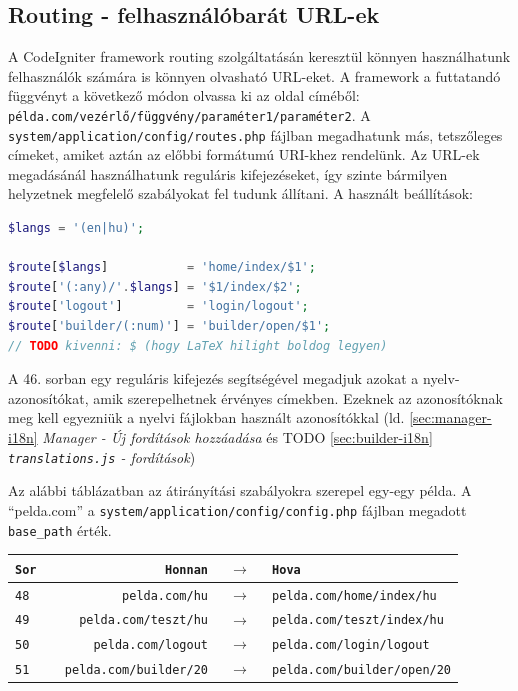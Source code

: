 \documentclass[12pt,a4paper,twoside]{article}
\begin{document}
\subsection{Routing - felhasználóbarát URL-ek}

A CodeIgniter framework routing\cite{CI-Routing} szolgáltatásán keresztül
könnyen használhatunk felhasználók számára is könnyen olvasható URL-eket.
A framework a futtatandó függvényt a következő módon olvassa ki az oldal
címéből: \texttt{példa.com/vezérlő/függvény/paraméter1/paraméter2}.
A \texttt{system/application/config/routes.php} fájlban megadhatunk más,
tetszőleges címeket, amiket aztán az előbbi formátumú URI-khez rendelünk. Az
URL-ek megadásánál használhatunk reguláris kifejezéseket\cite{regex}, így szinte
bármilyen helyzetnek megfelelő szabályokat fel tudunk állítani. A használt
beállítások:

\begin{lstlisting}[language=PHP, firstnumber=46]
$langs = '(en|hu)';

$route[$langs]           = 'home/index/$1';
$route['(:any)/'.$langs] = '$1/index/$2';
$route['logout']         = 'login/logout';
$route['builder/(:num)'] = 'builder/open/$1';
// TODO kivenni: $ (hogy LaTeX hilight boldog legyen)
\end{lstlisting}

A 46. sorban egy reguláris kifejezés segítségével megadjuk azokat a
nyelv-azonosítókat, amik szerepelhetnek érvényes címekben. Ezeknek az
azonosítóknak meg kell egyezniük a nyelvi fájlokban használt azonosítókkal
(ld. \ref{sec:manager-i18n} \textit{Manager - Új fordítások hozzáadása} és
TODO \ref{sec:builder-i18n} \textit{\texttt{translations.js} - fordítások})

Az alábbi táblázatban az átirányítási szabályokra szerepel egy-egy példa. A
``pelda.com'' a \texttt{system/application/config/config.php} fájlban megadott
\texttt{base\_path} érték.

\begin{tabular*}{\textwidth}{>{\tt}l|>{\tt}r>{$\rightarrow$}c>{\tt}l}
  \rm Sor & \rm Honnan           & & \rm Hova        \\
  \hline
  48      & pelda.com/hu         & & pelda.com/home/index/hu  \\
  49      & pelda.com/teszt/hu   & & pelda.com/teszt/index/hu \\
  50      & pelda.com/logout     & & pelda.com/login/logout   \\
  51      & pelda.com/builder/20 & & pelda.com/builder/open/20
\end{tabular*}
\end{document}

